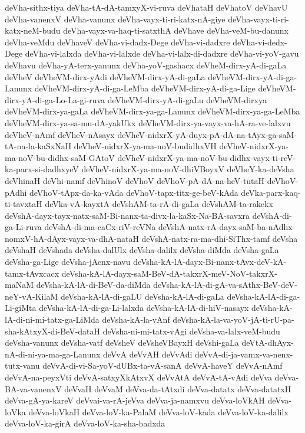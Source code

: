 {deVha-sithx-tiya
deVha-tA-dA-tamxyX-vi-ruva
deVhataH
deVhatoV
deVhavU
deVha-vanenxV
deVha-vanunx
deVha-vayx-ti-ri-katx-nA-giye
deVha-vayx-ti-ri-katx-neM-budu
deVha-vayx-va-haq-ti-satxthA
deVhave
deVha-veM-bu-danunx
deVha-veMdu
deVhaveV
deVha-vi-dadx-Dege
deVha-vi-dadxre
deVha-vi-dedx-Dege
deVha-vi-lalxda
deVha-vi-lalxde
deVha-vi-lalx-di-dadxre
deVha-vi-yoV-gavu
deVhavu
deVha-yA-terx-yanunx
deVha-yoV-gashacx
deVheM-dirx-yA-di-gaLa
deVheV
deVheVM-dirx-yAdi
deVheVM-dirx-yA-di-gaLa
deVheVM-dirx-yA-di-ga-Lanunx
deVheVM-dirx-yA-di-ga-LeMba
deVheVM-dirx-yA-di-ga-Lige
deVheVM-dirx-yA-di-ga-Lo-La-gi-ruva
deVheVM-dirx-yA-di-gaLu
deVheVM-dirxya
deVheVM-dirx-ya-gaLa
deVheVM-dirx-ya-ga-Lanunx
deVheVM-dirx-ya-ga-LeMba
deVheVM-dirx-ya-sa-mu-dA-yakUkx
deVheVM-dirx-ya-vayx-va-hA-ra-ve-lalxvu
deVheV-nAmf
deVheV-nAsayx
deVheV-nidxrX-yA-duyx-pA-dA-na-tAyx-ga-saM-tA-na-la-kaSxNaH
deVheV-nidxrX-ya-ma-noV-budidhxVH
deVheV-nidxrX-ya-ma-noV-bu-didhx-saM-GAtoV
deVheV-nidxrX-ya-ma-noV-bu-didhx-vayx-ti-reV-ka-parx-si-dadhxyeV
deVheV-nidxrX-ya-ma-noV-dhiVBoyxV
deVheY-ka-deVsha
deVhinaH
deVhi-namf
deVhinoV
deVhoV
deVhoV-pA-dA-na-heV-tutaH
deVhoV-pAdhi
deVhoV-tApx-da-ka-vAda
deVhoV-tapx-titx-ge-beV-kAda
deVka-parx-kaq-ti-tavxtaH
deVka-vA-kayxtA
deVshAM-ta-rA-di-gaLa
deVshAM-ta-rakekx
deVshA-dayx-tayx-natx-saM-Bi-nanx-ta-divx-la-kaSx-Na-BA-savxra
deVshA-di-ga-Li-ruva
deVshA-di-ma-caCx-riV-reVNa
deVshA-natx-rA-dayx-saM-ba-nAdhx-nomxV-hA-dAyx-vayx-va-dhA-nataH
deVshA-natx-ra-ma-dhi-SiThx-tamf
deVsha
deVshaH
deVshada
deVsha-dalUlx
deVsha-dalilx
deVsha-diMda
deVsha-gaLa
deVsha-ga-Lige
deVsha-jAcnx-navu
deVsha-kA-lA-dayx-Bi-nanx-tAvx-deV-kA-tamx-tAvxcacx
deVsha-kA-lA-dayx-saM-BeV-dA-takxrX-meV-NoV-takxrX-maNaM
deVsha-kA-lA-di-BeV-da-diMda
deVsha-kA-lA-di-gA-va-sAthx-BeV-deV-neY-vA-KilaM
deVsha-kA-lA-di-gaLU
deVsha-kA-lA-di-gaLa
deVsha-kA-lA-di-ga-Li-giMta
deVsha-kA-lA-di-ga-Li-lalxda
deVsha-kA-lA-di-hiV-nasayx
deVsha-kA-lA-di-ni-mi-tatx-ga-LiMda
deVsha-kA-la-vAnf
deVsha-kA-la-va-yoV-jA-ti-rU-pa-sha-kAtxyX-di-BeV-dataH
deVsha-ni-mi-tatx-vAgi
deVsha-va-lalx-veM-budu
deVsha-vanunx
deVsha-vatf
deVsheV
deVsheVBayxH
deVshi-gaLa
deVtA-dhAyx-nA-di-ni-ya-ma-ga-Lanunx
deVvA
deVvAH
deVvAdi
deVvA-di-ja-vamx-va-nenx-tutx-vanu
deVvA-di-vi-Sa-yoV-dUBx-ta-vA-sanA
deVvA-haveY
deVvA-nAmf
deVvA-na-peyxVti
deVvA-satxyXkAtxvX
deVvAtA
deVvA-tA-vAdi
deVva
deVva-BA-va-vanenxV
deVvaH
deVvaM
deVva-da-tAtxdi
deVva-datatx
deVva-datatxH
deVva-gA-ya-kareV
deVvai-va-rA-jeVva
deVva-ja-namxvu
deVva-loVkAH
deVva-loVka
deVva-loVkaH
deVva-loV-ka-PalaM
deVva-loV-kada
deVva-loV-ka-dalilx
deVva-loV-ka-girA
deVva-loV-ka-sha-badxda
}
